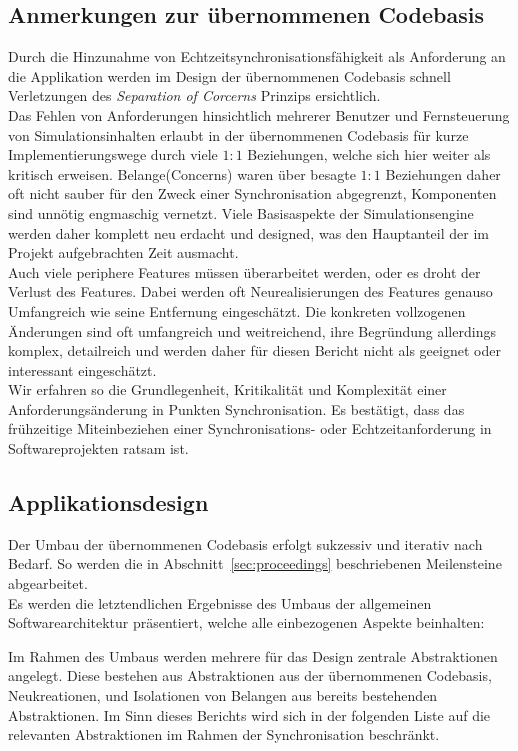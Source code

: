 \documentclass[11pt,twoside,a4paper]{article}
\begin{document}
\subsection{Anmerkungen zur übernommenen Codebasis}
Durch die Hinzunahme von Echtzeitsynchronisationsfähigkeit als Anforderung an die Applikation werden im Design der übernommenen Codebasis schnell Verletzungen des \textit{Separation of Corcerns} Prinzips ersichtlich.\\
Das Fehlen von Anforderungen hinsichtlich mehrerer Benutzer und Fernsteuerung von Simulationsinhalten erlaubt in der übernommenen Codebasis für kurze Implementierungswege durch viele $1:1$ Beziehungen, welche sich hier weiter als kritisch erweisen. Belange(Concerns) waren über besagte $1:1$ Beziehungen daher oft nicht sauber für den Zweck einer Synchronisation abgegrenzt, Komponenten sind unnötig engmaschig vernetzt. Viele Basisaspekte der Simulationsengine werden daher komplett neu erdacht und designed, was den Hauptanteil der im Projekt aufgebrachten Zeit ausmacht.\\
Auch viele periphere Features müssen überarbeitet werden, oder es droht der Verlust des Features. Dabei werden oft Neurealisierungen des Features genauso Umfangreich wie seine Entfernung eingeschätzt.
Die konkreten vollzogenen Änderungen sind oft umfangreich und weitreichend, ihre Begründung allerdings komplex, detailreich und werden daher für diesen Bericht nicht als geeignet oder interessant eingeschätzt.\\
Wir erfahren so die Grundlegenheit, Kritikalität und Komplexität einer Anforderungsänderung in Punkten Synchronisation.
Es bestätigt, dass das frühzeitige Miteinbeziehen einer Synchronisations- oder Echtzeitanforderung in Softwareprojekten ratsam ist.


\subsection{Applikationsdesign}
Der Umbau der übernommenen Codebasis erfolgt sukzessiv und iterativ nach Bedarf. 
So werden die in Abschnitt~\ref{sec:proceedings} beschriebenen Meilensteine abgearbeitet.\\
Es werden die letztendlichen Ergebnisse des Umbaus der allgemeinen Softwarearchitektur präsentiert, welche alle einbezogenen Aspekte beinhalten:

Im Rahmen des Umbaus werden mehrere für das Design zentrale Abstraktionen angelegt.
Diese bestehen aus Abstraktionen aus der übernommenen Codebasis, Neukreationen, und Isolationen von Belangen aus bereits bestehenden Abstraktionen. Im Sinn dieses Berichts wird sich in der folgenden Liste auf die relevanten Abstraktionen im Rahmen der Synchronisation beschränkt.
\end{document}
